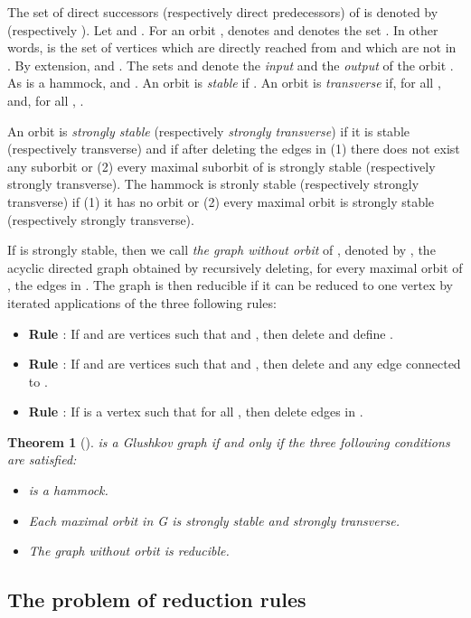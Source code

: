 \documentclass[11pt]{article}
\newtheorem{theorem}{Theorem}
\begin{document}
The set of direct successors (respectively direct predecessors) of  is denoted by   (respectively ). Let  and . 
For an orbit  ,  denotes  and  denotes the set .
In other words,  is the set of vertices which are directly reached from  and which are not in . By extension,  and  .
The sets   and 
denote  the {\it input} and the {\it output} of the orbit . As  is a hammock,  and  
. 
An orbit  is  {\it stable} if .
An orbit  is  {\it transverse} if, for all ,  
and, for all ,  . 

An orbit  is {\it strongly stable} (respectively {\it strongly transverse}) if it is stable (respectively transverse)  and if after deleting the edges  in  (1) there does not exist any suborbit  or (2) every maximal suborbit of   is strongly  stable (respectively strongly transverse).
The hammock  is stronly stable (respectively strongly transverse) if (1) it has no orbit or (2) every maximal orbit  is strongly stable (respectively strongly transverse).

If   is  strongly  stable, then we call {\it the graph without orbit} of , denoted by , the acyclic directed graph obtained by recursively deleting, for every maximal orbit   of , the edges in . The graph  is then reducible if it can be reduced to one vertex by iterated applications of the three following rules:
\begin{itemize}
\item {\bf Rule {\bf }}: If  and  are vertices such that  and , then delete  and define .
\item{\bf Rule  {\bf }}: If  and  are vertices such that  and , then delete  and any edge connected to .	
\item{\bf Rule {\bf }}: If  is a vertex such that for all , then delete edges in .  
\end{itemize}
 
\begin{theorem}[\cite{CZ97}]\label{th}
 is a Glushkov graph if and only if the three following conditions are satisfied: 
\begin{itemize}
\item  is a  hammock.
\item Each maximal orbit in G is  {\it strongly  stable} and {\it strongly transverse}.
\item The graph without orbit  is {\it reducible}.
\end{itemize}
\end{theorem}

\subsection{The problem of reduction rules}
\end{document}
